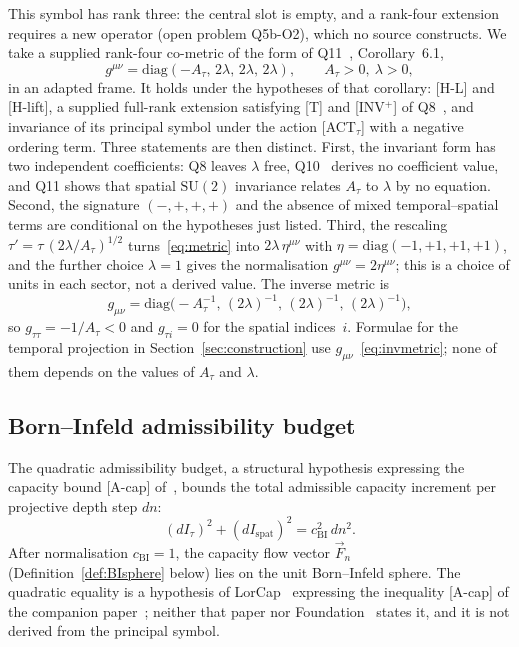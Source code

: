 \documentclass[11pt,a4paper]{article}
\begin{document}
      This symbol has rank three: the central slot is empty, and a rank-four extension requires a new operator
      (open problem Q5b-O2), which no source constructs.
      We take a supplied rank-four co-metric of the form of Q11~\cite{Beau2026q11}, Corollary~6.1,
      \begin{equation}\label{eq:metric}
        g^{\mu\nu} = \mathrm{diag}(-A_\tau,\, 2\lambda,\, 2\lambda,\, 2\lambda),
        \qquad A_\tau > 0,\ \lambda > 0,
      \end{equation}
      in an adapted frame.
      It holds under the hypotheses of that corollary: [H-L] and [H-lift], a supplied full-rank extension satisfying
      [T] and [INV$^+$] of Q8~\cite{BeauQ8}, and invariance of its principal symbol under the action [ACT$_\tau$]
      with a negative ordering term.
      Three statements are then distinct.
      First, the invariant form has two independent coefficients: Q8 leaves $\lambda$ free, Q10~\cite{Beau2026q10}
      derives no coefficient value, and Q11 shows that spatial $\mathrm{SU}(2)$ invariance relates $A_\tau$ to
      $\lambda$ by no equation.
      Second, the signature $(-,+,+,+)$ and the absence of mixed temporal--spatial terms are conditional on the
      hypotheses just listed.
      Third, the rescaling $\tau' = \tau\,(2\lambda/A_\tau)^{1/2}$ turns~\eqref{eq:metric} into
      $2\lambda\,\eta^{\mu\nu}$ with $\eta = \mathrm{diag}(-1,+1,+1,+1)$, and the further choice $\lambda = 1$ gives
      the normalisation $g^{\mu\nu} = 2\eta^{\mu\nu}$; this is a choice of units in each sector, not a derived
      value.
      The inverse metric is
      \begin{equation}\label{eq:invmetric}
        g_{\mu\nu} = \mathrm{diag}\bigl(-A_\tau^{-1},\, (2\lambda)^{-1},\, (2\lambda)^{-1},\, (2\lambda)^{-1}\bigr),
      \end{equation}
      so $g_{\tau\tau} = -1/A_\tau < 0$ and $g_{\tau i} = 0$ for the spatial indices~$i$.
      Formulae for the temporal projection in Section~\ref{sec:construction} use
      $g_{\mu\nu}$~\eqref{eq:invmetric}; none of them depends on the values of $A_\tau$ and $\lambda$.

    \subsection{Born--Infeld admissibility budget}

      The quadratic admissibility budget, a structural hypothesis expressing the capacity
      bound [A-cap] of~\cite{Beau2026c}, bounds the total admissible
      capacity increment per projective depth step $dn$:
      \begin{equation}\label{eq:BI}
        (dI_\tau)^2 + (dI_{\mathrm{spat}})^2 = c_{\mathrm{BI}}^2\,dn^2.
      \end{equation}
      After normalisation $c_{\mathrm{BI}} = 1$, the capacity flow vector $\vec{F}_n$
      (Definition~\ref{def:BIsphere} below) lies on the unit Born--Infeld sphere.
      The quadratic equality is a hypothesis of LorCap~\cite{Beau2026n} expressing the inequality [A-cap] of
      the companion paper~\cite{Beau2026c}; neither that paper nor Foundation~\cite{Beau2026m} states it, and it is
      not derived from the principal symbol.
\end{document}
